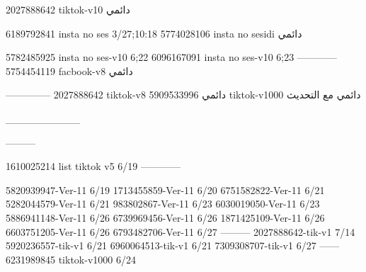2027888642 tiktok-v10
دائمي

6189792841 insta no ses
3/27;10:18
5774028106 insta no sesidi
دائمي


5782485925 insta no ses-v10
6;22
6096167091 insta no ses-v10
6;23
------------
5754454119 facbook-v8
دائمي


--------------
2027888642 tiktok-v8
دائمي
5909533996 tiktok-v1000
دائمي مع التحديث

__________

---------

1610025214 list tiktok v5
6/19
------------

5820939947-Ver-11
6/19
1713455859-Ver-11
6/20
6751582822-Ver-11
6/21
5282044579-Ver-11
6/21
983802867-Ver-11
6/23
6030019050-Ver-11
6/23
5886941148-Ver-11
6/26
6739969456-Ver-11
6/26
1871425109-Ver-11
6/26
6603751205-Ver-11
6/26
6793482706-Ver-11
6/27
---------
2027888642-tik-v1
7/14
5920236557-tik-v1
6/21
6960064513-tik-v1
6/21
7309308707-tik-v1
6/27
------
6231989845 tiktok-v1000
6/24
